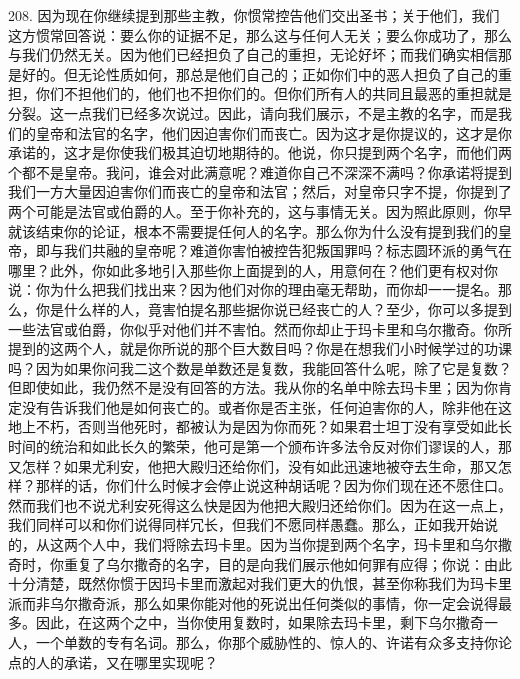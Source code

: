 208. 因为现在你继续提到那些主教，你惯常控告他们交出圣书；关于他们，我们这方惯常回答说：要么你的证据不足，那么这与任何人无关；要么你成功了，那么与我们仍然无关。因为他们已经担负了自己的重担，无论好坏；而我们确实相信那是好的。但无论性质如何，那总是他们自己的；正如你们中的恶人担负了自己的重担，你们不担他们的，他们也不担你们的。但你们所有人的共同且最恶的重担就是分裂。这一点我们已经多次说过。因此，请向我们展示，不是主教的名字，而是我们的皇帝和法官的名字，他们因迫害你们而丧亡。因为这才是你提议的，这才是你承诺的，这才是你使我们极其迫切地期待的。他说，你只提到两个名字，而他们两个都不是皇帝。我问，谁会对此满意呢？难道你自己不深深不满吗？你承诺将提到我们一方大量因迫害你们而丧亡的皇帝和法官；然后，对皇帝只字不提，你提到了两个可能是法官或伯爵的人。至于你补充的，这与事情无关。因为照此原则，你早就该结束你的论证，根本不需要提任何人的名字。那么你为什么没有提到我们的皇帝，即与我们共融的皇帝呢？难道你害怕被控告犯叛国罪吗？标志圆环派的勇气在哪里？此外，你如此多地引入那些你上面提到的人，用意何在？他们更有权对你说：你为什么把我们找出来？因为他们对你的理由毫无帮助，而你却一一提名。那么，你是什么样的人，竟害怕提名那些据你说已经丧亡的人？至少，你可以多提到一些法官或伯爵，你似乎对他们并不害怕。然而你却止于玛卡里和乌尔撒奇。你所提到的这两个人，就是你所说的那个巨大数目吗？你是在想我们小时候学过的功课吗？因为如果你问我二这个数是单数还是复数，我能回答什么呢，除了它是复数？但即使如此，我仍然不是没有回答的方法。我从你的名单中除去玛卡里；因为你肯定没有告诉我们他是如何丧亡的。或者你是否主张，任何迫害你的人，除非他在这地上不朽，否则当他死时，都被认为是因为你而死？如果君士坦丁没有享受如此长时间的统治和如此长久的繁荣，他可是第一个颁布许多法令反对你们谬误的人，那又怎样？如果尤利安，他把大殿归还给你们，没有如此迅速地被夺去生命，那又怎样？那样的话，你们什么时候才会停止说这种胡话呢？因为你们现在还不愿住口。然而我们也不说尤利安死得这么快是因为他把大殿归还给你们。因为在这一点上，我们同样可以和你们说得同样冗长，但我们不愿同样愚蠢。那么，正如我开始说的，从这两个人中，我们将除去玛卡里。因为当你提到两个名字，玛卡里和乌尔撒奇时，你重复了乌尔撒奇的名字，目的是向我们展示他如何罪有应得；你说：由此十分清楚，既然你惯于因玛卡里而激起对我们更大的仇恨，甚至你称我们为玛卡里派而非乌尔撒奇派，那么如果你能对他的死说出任何类似的事情，你一定会说得最多。因此，在这两个之中，当你使用复数时，如果除去玛卡里，剩下乌尔撒奇一人，一个单数的专有名词。那么，你那个威胁性的、惊人的、许诺有众多支持你论点的人的承诺，又在哪里实现呢？\par

